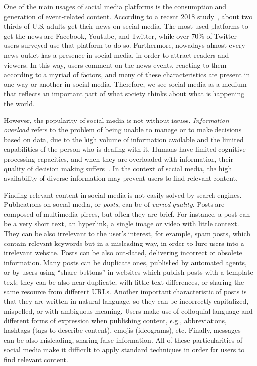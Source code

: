 \begin{intro}


One of the main usages of social media platforms is the consumption and
generation of event-related content. 
%
According to a recent 2018 study~\cite{pewresearch}, about two thirds of U.S.
adults get their news on social media.
%
The most used platforms to get the news are Facebook, Youtube, and Twitter,
while over 70\% of Twitter users surveyed use that platform to do so.
%
Furthermore, nowadays almost every news outlet has a presence in social media,
in order to attract readers and viewers.
%
In this way, users comment on the news events, reacting to them according to a
myriad of factors, and many of these characteristics are present in one way or
another in social media.
%
Therefore, we see social media as a medium that reflects an important 
part of what society thinks about what is happening the world.





However, the popularity of social media is not without issues. 
%
{\em Information overload} refers to the problem of being unable to manage or to
make decisions based on data, due to the high volume of information available
and the limited capabilities of the person who is dealing with it. 
%
Humans have limited cognitive processing capacities, and when they are
overloaded with information, their quality of decision making
suffers~\cite{gross1964managing}. 
%
In the context of social media, the high availability of diverse information may
prevent users to find relevant content.


Finding relevant content in social media is not easily solved by search engines.
%
Publications on social media, or {\em posts}, can be of {\em varied quality}.
%
Posts are composed of multimedia pieces, but often they are brief.
%
For instance, a post can be a very short text, an hyperlink, a single image or
video with little context.
%
They can be also irrelevant to the user's interest, for example, spam posts,
which contain relevant keywords but in a misleading way, in order to lure users
into a irrelevant website. 
%
Posts can be also out-dated, delivering incorrect or obsolete information. 
%
Many posts can be duplicate ones, published by automated agents, or by users
using ``share buttons'' in websites which publish posts with a template text; 
%
they can be also near-duplicate, with little text differences, or sharing the
same resource from different URLs.
%
Another important characteristic of posts is that they are written in natural
language, so they can be incorrectly capitalized, mispelled, or with ambiguous
meaning.
%
Users make use of colloquial language and different forms of expression when
publishing content, e.g., abbreviations, hashtags (tags to describe content),
emojis (ideograms), etc.
%
Finally, messages can be also misleading, sharing false information.
%
All of these particularities of social media make it difficult to apply standard
techniques in order for users to find relevant content.


\end{intro}
